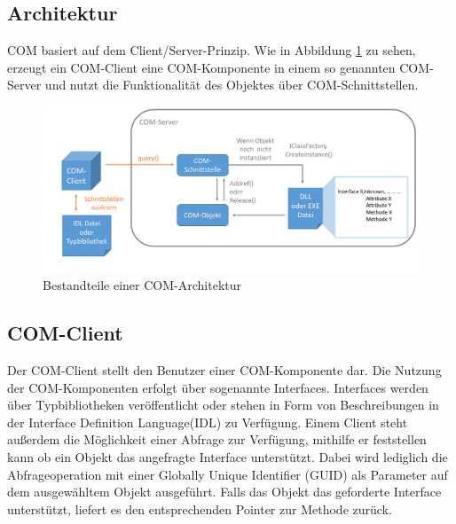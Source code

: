 \subsection{Architektur}
\label{ch:grundlagen:sec:ComponentObjectModel:subsec:Architektur}

COM basiert auf dem Client/Server-Prinzip. Wie in Abbildung \ref{GL_COM} zu sehen, erzeugt ein COM-Client eine COM-Komponente in einem so genannten COM-Server und nutzt die Funktionalität des Objektes über COM-Schnittstellen. 

\begin{figure}[htbp]
	\centering
  \includegraphics[width=1.0\textwidth, width=1.0\textwidth]{pics/Grundlagen_com.pdf}
	\caption{Bestandteile einer COM-Architektur}
	\label{GL_COM}
\end{figure} 

\subsection{COM-Client}
\label{ch:grundlagen:sec:ComponentObjectModel:subsec:COMClient}

Der COM-Client stellt den Benutzer einer COM-Komponente dar. Die Nutzung der COM-Komponenten erfolgt über sogenannte Interfaces. Interfaces werden über Typbibliotheken veröffentlicht oder stehen in Form von Beschreibungen in der Interface Definition Language(IDL) zu Verfügung. Einem Client steht außerdem die Möglichkeit einer Abfrage zur Verfügung, mithilfe er feststellen kann ob ein Objekt das angefragte Interface unterstützt. Dabei wird lediglich die Abfrageoperation mit einer  Globally Unique Identifier (GUID) als Parameter auf dem ausgewähltem Objekt ausgeführt. Falls das Objekt das geforderte Interface unterstützt, liefert es den entsprechenden Pointer zur Methode zurück.  

